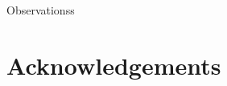 \documentclass[12pt]{article}
\begin{document}
Observationss

\cite{wright.coleman:71}
\cite{kilcher.nash:10}
\cite{jay.ea:10}
\cite{stashchuk.vlasenko:09}
\cite{nash.ea:09}
\cite{pritchard.huntley:06}
\cite{garvine:91,garvine:87,garvine:84,garvine:82,garvine:74b,garvine:74}
\cite{jay.ea:inpress}
\cite{hetland.macdonald:08}
\cite{chen.macdonald:06,orton.jay:05,nash.moum:05}
\cite{pritchard.huntley:02}
\cite{odonnell:90}
\cite{odonnell.ea:98}

\section*{Acknowledgements}





\clearpage
\listoffigures

\clearpage
\end{document}
